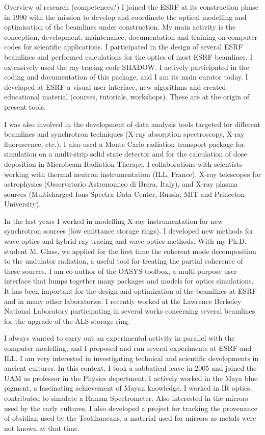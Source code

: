\begin{rubric}{Overview of research (competences?)}
I joined the ESRF at its construction phase in 1990 with the mission to develop and coordinate the optical modelling and optimisation of the beamlines under construction.
My main activity is the conception, development, maintenance, documentation and training on
computer codes for scientific applications. I participated in the design of several ESRF beamlines and performed calculations for the optics of most ESRF beamlines.
I extensively used the ray-tracing code SHADOW. I actively participated in the coding and
documentation of this package, and I am its main curator today. I developed at ESRF a visual user interface, new algorithms and
created educational material (courses, tutorials, workshops). These are at the origin of present tools.

I was also involved in the development of data analysis tools targeted for different beamlines and
synchrotron techniques (X-ray absorption spectroscopy, X-ray fluorescence, etc.). I also used a
Monte Carlo radiation transport package for simulation on a multi-strip solid state detector and for
the calculation of dose deposition in Microbeam Radiation Therapy.
I collaborations with scientists working with thermal neutron instrumentation (ILL, France),
X-ray telescopes for astrophysics (Osservatorio Astronomico di Brera, Italy), and X-ray plasma
sources (Multicharged Ions Spectra Data Center, Russia; MIT and Princeton University). 

In the last years I worked in modelling X-ray instrumentation for new synchrotron sources (low emittance storage rings). I developed new methods for wave-optics and hybrid ray-tracing and wave-optics methods. With my Ph.D. student M. Glass, we applied for the first time the coherent mode decomposition to the undulator radiation, a useful tool for treating the partial coherence of these sources. I am co-author of the OASYS toolbox, a multi-purpose user-interface that lumps together many packages and models for optics simulations. It has been important for the design and optimization of the beamlines at ESRF and in many other laboratories. I recently worked at the Lawrence Berkeley National Laboratory participating in several works concerning several beamlines for the upgrade of the ALS storage ring. 

I always wanted to carry out an experimental activity in parallel with the computer
modelling, and I proposed and run several experiments at ESRF and ILL. I am very interested in investigating technical and scientific developments in ancient cultures. In this context, I took a sabbatical leave in 2005 and joined the UAM as professor in the Physics depertment. I actively worked in the Maya blue pigment, a fascinating achievement of Mayan knowledge. I worked in IR optics, contributed to simulate a Raman Spectrometer. Also interested in the mirrors used by the early cultures, I also developed a project for tracking the provenance of obsidian used by the Teotihuacans, a material used for mirrors as metals were not known at that time.





\end{rubric}
